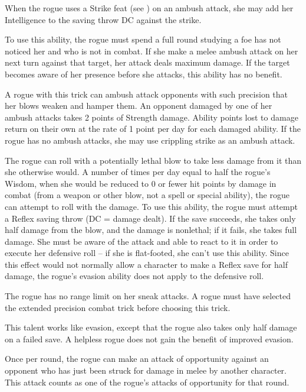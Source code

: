  When the rogue uses a Strike feat (see ) on an ambush attack, she may add her Intelligence to the saving throw DC against the strike.

 To use this ability, the rogue must spend a full round studying a foe has not noticed her and who is not in combat. If she make a melee ambush attack on her next turn against that target, her attack deals maximum damage. If the target becomes aware of her presence before she attacks, this ability has no benefit.

 A rogue with this trick can ambush attack opponents with such precision that her blows weaken and hamper them. An opponent damaged by one of her ambush attacks takes 2 points of Strength damage. Ability points lost to damage return on their own at the rate of 1 point per day for each damaged ability. If the rogue has no ambush attacks, she may use crippling strike as an ambush attack.

  The rogue can roll with a potentially lethal blow to take less damage from it than she otherwise would.  A number of times per day equal to half the rogue's Wisdom, when she would be reduced to 0 or fewer hit points by damage in combat (from a weapon or other blow, not a spell or special ability), the rogue can attempt to roll with the damage. To use this ability, the rogue must attempt a Reflex saving throw (DC = damage dealt). If the save succeeds, she takes only half damage from the blow, and the damage is nonlethal; if it fails, she takes full damage. She must be aware of the attack and able to react to it in order to execute her defensive roll -- if she is flat-footed, she can't use this ability. Since this effect would not normally allow a character to make a Reflex save for half damage, the rogue's evasion ability does not apply to the defensive roll.

 The rogue has no range limit on her sneak attacks. A rogue must have selected the extended precision combat trick before choosing this trick.

 This talent works like evasion, except that the rogue also takes only half damage on a failed save. A helpless rogue does not gain the benefit of improved evasion.

  Once per round, the rogue can make an attack of opportunity against an opponent who has just been struck for damage in melee by another character. This attack counts as one of the rogue's attacks of opportunity for that round.

